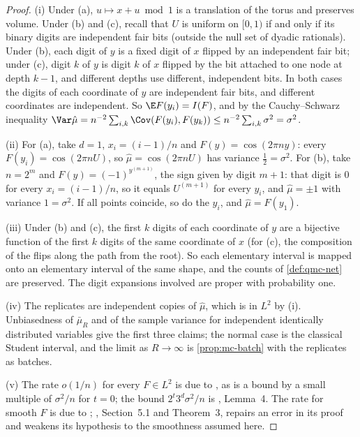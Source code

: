 \begin{proof}
(i) Under (a), $u\mapsto x+u\bmod1$ is a translation of the torus and preserves volume. Under
(b) and (c), recall that $U$ is uniform on $[0,1)$ if and only if its binary digits are
independent fair bits (outside the null set of dyadic rationals). Under (b), each digit of $y$
is a fixed digit of $x$ flipped by an independent fair bit; under (c), digit $k$ of $y$ is
digit $k$ of $x$ flipped by the bit attached to one node at depth $k-1$, and different depths
use different, independent bits. In both cases the digits of each coordinate of $y$ are
independent fair bits, and different coordinates are independent. So
$\E F(y_i)=I(F)$, and by the Cauchy--Schwarz inequality
$\Var\hat\mu=n^{-2}\sum_{i,k}\Cov(F(y_i),F(y_k))\le n^{-2}\sum_{i,k}\sigma^2=\sigma^2$.

(ii) For (a), take $d=1$, $x_i=(i-1)/n$ and $F(y)=\cos(2\pi ny)$: every
$F(y_i)=\cos(2\pi nU)$, so $\hat\mu=\cos(2\pi nU)$ has variance $\frac12=\sigma^2$. For (b), take
$n=2^m$ and $F(y)=(-1)^{y^{(m+1)}}$, the sign given by digit $m+1$: that digit is $0$ for every
$x_i=(i-1)/n$, so it equals $U^{(m+1)}$ for every $y_i$, and $\hat\mu=\pm1$ with variance
$1=\sigma^2$.
If all points coincide, so do the $y_i$, and $\hat\mu=F(y_1)$.

(iii) Under (b) and (c), the first $k$ digits of each coordinate of $y$ are a bijective function
of the first $k$ digits of the same coordinate of $x$ (for (c), the composition of the flips
along the path from the root). So each elementary interval is mapped onto an elementary
interval of the same shape, and the counts of \cref{def:qmc-net} are preserved. The digit
expansions involved are proper with probability one.

(iv) The replicates are independent copies of $\hat\mu$, which is in $L^2$ by (i). Unbiasedness
of $\bar\mu_R$ and of the sample variance for independent identically distributed variables give
the first three claims; the normal case is the classical Student interval, and the limit as
$R\to\infty$ is \cref{prop:mc-batch} with the replicates as batches.

(v) The rate $o(1/n)$ for every $F\in L^2$ is due to \textcite{owen-scrambled-nets}, as is a
bound by a small multiple of $\sigma^2/n$ for $t=0$; the bound $2^t3^d\sigma^2/n$ is
\textcite{owen-1998}, Lemma~4. The rate for smooth $F$ is due to \textcite{owen-1997b};
\textcite{owen-2008}, Section~5.1 and Theorem~3, repairs an error in its proof and weakens its
hypothesis to the smoothness assumed here.
\end{proof}

